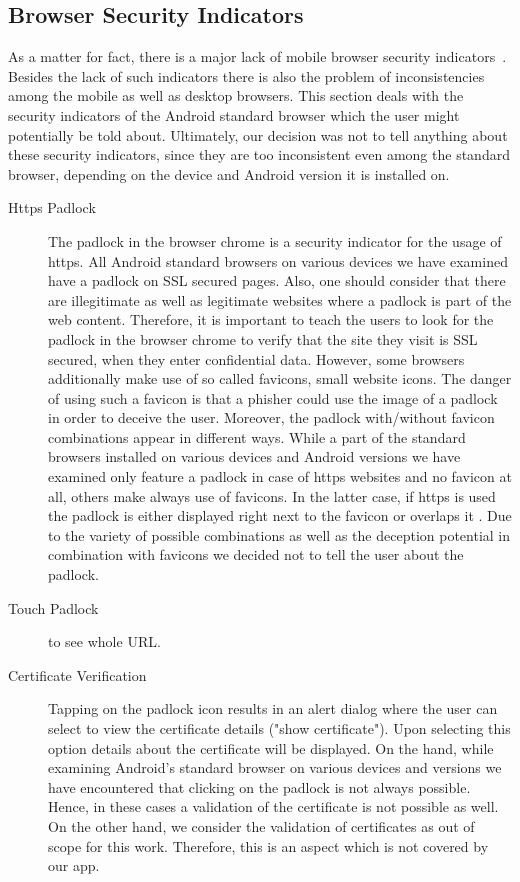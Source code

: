 \subsection{Browser Security Indicators}
As a matter for fact, there is a major lack of mobile browser security indicators~\cite{amrutkar2012measuring,trusteer2011}. 
Besides the lack of such indicators there is also the problem of inconsistencies among the mobile as well as desktop browsers.
This section deals with the security indicators of the Android standard browser which the user might potentially be told about.
Ultimately, our decision was not to tell anything about these security indicators, since they are too inconsistent even among the standard browser, depending on the device and Android version it is installed on.
\begin{description}
		\item[Https Padlock] The padlock in the browser chrome is a security indicator for the usage of https.
All Android standard browsers on various devices we have examined have a padlock on SSL secured pages.
Also, one should consider that there are illegitimate as well as legitimate websites where a padlock is part of the web content. 
Therefore, it is important to teach the users to look for the padlock in the browser chrome to verify that the site they visit is SSL secured, when they enter confidential data.
However, some browsers additionally make use of so called favicons, small website icons.
The danger of using such a favicon is that a phisher could use the image of a padlock~\cite{trusteer2011} in order to deceive the user.
Moreover, the padlock with/without favicon combinations appear in different ways. 
While a part of the standard browsers installed on various devices and Android versions we have examined only feature a padlock in case of https websites and no favicon at all, others make always use of favicons. 
In the latter case, if https is used the padlock is either displayed right next to the favicon or overlaps it .
Due to the variety of possible combinations as well as the deception potential in combination with favicons we decided not to tell the user about the padlock.
		\item[Touch Padlock] to see whole URL.
		\item[Certificate Verification]Tapping on the padlock icon results in an alert dialog where the user can select to view the certificate details ("show certificate").
Upon selecting this option details about the certificate will be displayed.
On the hand, while examining Android's standard browser on various devices and versions we have encountered that clicking on the padlock is not always possible. 
Hence, in these cases a validation of the certificate is not possible as well.
On the other hand, we consider the validation of certificates as out of scope for this work.
Therefore, this is an aspect which is not covered by our app.

\end{description}

